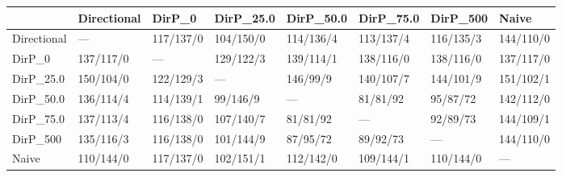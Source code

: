 \begin{tabular}{llllllll}
\toprule
{} & Directional &     DirP\_0 &  DirP\_25.0 &  DirP\_50.0 &  DirP\_75.0 &   DirP\_500 &      Naive \\
\midrule
Directional &         --- &  117/137/0 &  104/150/0 &  114/136/4 &  113/137/4 &  116/135/3 &  144/110/0 \\
DirP\_0      &   137/117/0 &        --- &  129/122/3 &  139/114/1 &  138/116/0 &  138/116/0 &  137/117/0 \\
DirP\_25.0   &   150/104/0 &  122/129/3 &        --- &   146/99/9 &  140/107/7 &  144/101/9 &  151/102/1 \\
DirP\_50.0   &   136/114/4 &  114/139/1 &   99/146/9 &        --- &   81/81/92 &   95/87/72 &  142/112/0 \\
DirP\_75.0   &   137/113/4 &  116/138/0 &  107/140/7 &   81/81/92 &        --- &   92/89/73 &  144/109/1 \\
DirP\_500    &   135/116/3 &  116/138/0 &  101/144/9 &   87/95/72 &   89/92/73 &        --- &  144/110/0 \\
Naive       &   110/144/0 &  117/137/0 &  102/151/1 &  112/142/0 &  109/144/1 &  110/144/0 &        --- \\
\bottomrule
\end{tabular}
